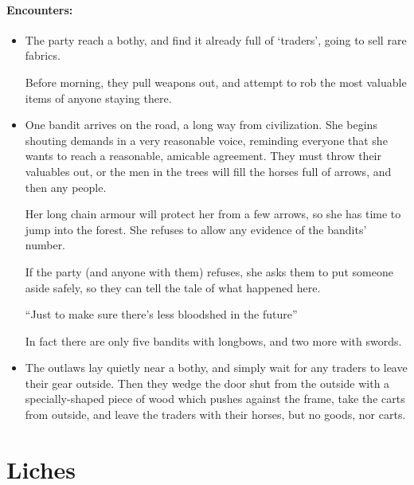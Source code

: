 \begin{multicols}{2}
\label{bandit}

\label{brigand}

\paragraph{Encounters:}


\begin{itemize}
  \item
  The party reach a bothy, and find it already full of `traders', going to sell rare fabrics.

  Before morning, they pull weapons out, and attempt to rob the most valuable items of anyone staying there.
  \item
  One bandit arrives on the road, a long way from civilization.
  She begins shouting demands in a very reasonable voice, reminding everyone that she wants to reach a reasonable, amicable agreement.
  They must throw their valuables out, or the men in the trees will fill the horses full of arrows, and then any people.

  Her long chain armour will protect her from a few arrows, so she has time to jump into the forest.
  She refuses to allow any evidence of the bandits' number.

  If the party (and anyone with them) refuses, she asks them to put someone aside safely, so they can tell the tale of what happened here.

  ``Just to make sure there's less bloodshed in the future''

  In fact there are only five bandits with longbows, and two more with swords.
  \item
  The outlaws lay quietly near a bothy, and simply wait for any traders to leave their gear outside.
  Then they wedge the door shut from the outside with a specially-shaped piece of wood which pushes against the frame, take the carts from outside, and leave the traders with their horses, but no goods, nor carts.
\end{itemize}

\end{multicols}

\section[Lich]{Liches}
\label{lich}


